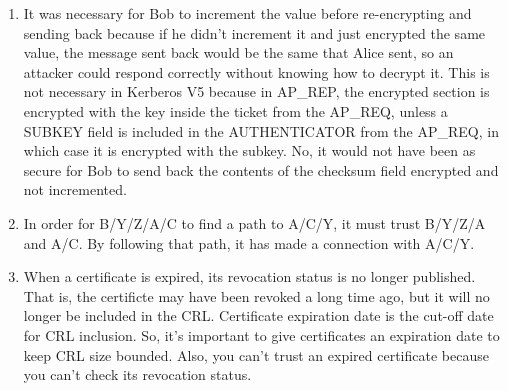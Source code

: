 \documentclass[11pt]{article}
\begin{document}
\begin{enumerate}
\item 

It was necessary for Bob to increment the value before re-encrypting and sending back because if he didn't increment it and just encrypted the same value, the message sent back would be the same that Alice sent, so an attacker could respond correctly without knowing how to decrypt it.  This is not necessary in Kerberos V5 because in AP\_REP, the encrypted section is encrypted with the key inside the ticket from the AP\_REQ, unless a SUBKEY field is included in the AUTHENTICATOR from the AP\_REQ, in which case it is encrypted with the subkey.  No, it would not have been as secure for Bob to send back the contents of the checksum field encrypted and not incremented.  

\item 

In order for B/Y/Z/A/C to find a path to A/C/Y, it must trust B/Y/Z/A and A/C.  By following that path, it has made a connection with A/C/Y.  

\item 

When a certificate is expired, its revocation status is no longer published.  That is, the certificte may have been revoked a long time ago, but it will no longer be included in the CRL.  Certificate expiration date is the cut-off date for CRL inclusion.  So, it's important to give certificates an expiration date to keep CRL size bounded.  Also, you can't trust an expired certificate because you can't check its revocation status.  

\end{enumerate}
\end{document}
